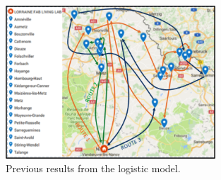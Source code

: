 \begin{figure}[H]
	\centering
		\includegraphics[width=0.7\textwidth]{Figures/Pavlo/Results.png}
		\caption{Previous results from the logistic model.}
		\label{Results.Pavlo}		
\end{figure}

